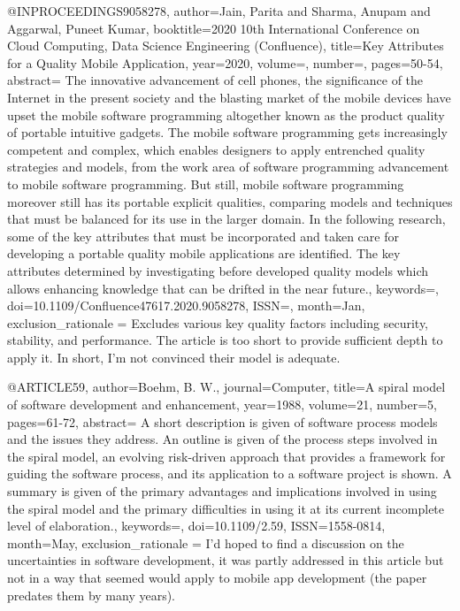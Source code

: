 @INPROCEEDINGS{9058278,  
  author={Jain, Parita and Sharma, Anupam and Aggarwal, Puneet Kumar},  
  booktitle={2020 10th International Conference on Cloud Computing, Data Science   Engineering (Confluence)},  
  title={Key Attributes for a Quality Mobile Application}, 
  year={2020},  
  volume={}, 
  number={}, 
  pages={50-54}, 
  abstract={
    The innovative advancement of cell phones, the significance of the Internet in the present society and the blasting market of the mobile devices have upset the mobile software programming altogether known as the product quality of portable intuitive gadgets. The mobile software programming gets increasingly competent and complex, which enables designers to apply entrenched quality strategies and models, from the work area of software programming advancement to mobile software programming. But still, mobile software programming moreover still has its portable explicit qualities, comparing models and techniques that must be balanced for its use in the larger domain. In the following research, some of the key attributes that must be incorporated and taken care for developing a portable quality mobile applications are identified. The key attributes determined by investigating before developed quality models which allows enhancing knowledge that can be drifted in the near future.},  
  keywords={},  
  doi={10.1109/Confluence47617.2020.9058278},
  ISSN={},
  month={Jan},
  exclusion_rationale = {Excludes various key quality factors including security, stability, and performance. The article is too short to provide sufficient depth to apply it. In short, I'm not convinced their model is adequate.}
}

@ARTICLE{59,
  author={Boehm, B. W.}, 
  journal={Computer},  
  title={A spiral model of software development and enhancement},  
  year={1988},
  volume={21},
  number={5},
  pages={61-72},
  abstract={
    A short description is given of software process models and the issues they address. An outline is given of the process steps involved in the spiral model, an evolving risk-driven approach that provides a framework for guiding the software process, and its application to a software project is shown. A summary is given of the primary advantages and implications involved in using the spiral model and the primary difficulties in using it at its current incomplete level of elaboration.}, 
  keywords={},  
  doi={10.1109/2.59}, 
  ISSN={1558-0814}, 
  month={May},
  exclusion_rationale = {I'd hoped to find a discussion on the uncertainties in software development, it was partly addressed in this article but not in a way that seemed would apply to mobile app development (the paper predates them by many years).}
}